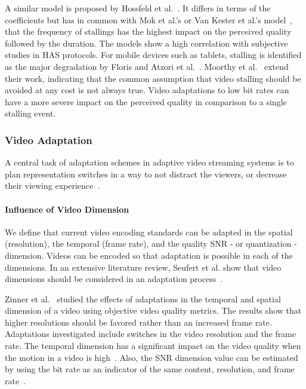 A similar model is proposed by Hossfeld et al.~\cite{Hossfeld2013}.
It differs in terms of the coefficients but has in common with Mok et al.'s or Van Kester et al.'s model~\cite{VanKester2011}, that the frequency of \acp{stalling} has the highest impact on the perceived quality followed by the duration.
The models show a high correlation with subjective studies in \ac{HAS} protocols.
For mobile devices such as tablets, stalling is identified as the major degradation by Floris and Atzori et al.~\cite{Atzori2014,Floris2012}.
Moorthy et al.~\cite{Moorthy2012} extend their work, indicating that the common assumption that video stalling should be avoided at any cost is not always true. 
Video adaptations to low bit rates can have a more severe impact on the perceived quality in comparison to a single stalling event.
\subsubsection{Video Adaptation} 
\label{sec:250_videoAdaptation}   
A central task of adaptation schemes in adaptive video streaming systems is to plan representation switches in a way to not distract the viewers, or decrease their viewing experience~\cite{Papadimitriou2007}.

\paragraph{Influence of Video Dimension}
We define that current video encoding standards can be adapted in the spatial (resolution), the temporal (frame rate), and the quality \ac{SNR} - or quantization - dimension.
Videos can be encoded so that adaptation is possible in each of the dimensions.
In an extensive literature review, Seufert et al. show that video dimensions should be considered in an adaptation process~\cite{Seufert2015}. 

Zinner et al.~\cite{Zinner2010} studied the effects of adaptations in the temporal and spatial dimension of a video
using objective video quality metrics.
The results show that higher resolutions should be favored rather than an increased frame rate. 
Adaptations investigated include switches in the video resolution and the frame rate.
The temporal dimension has a significant impact on the video quality when the motion in a video is high~\cite{Ghinea1998}.
Also, the \ac{SNR} dimension value can be estimated by using the bit rate as an indicator of the same content, resolution, and frame rate~\cite{Garcia2010,Zhai2008}.

